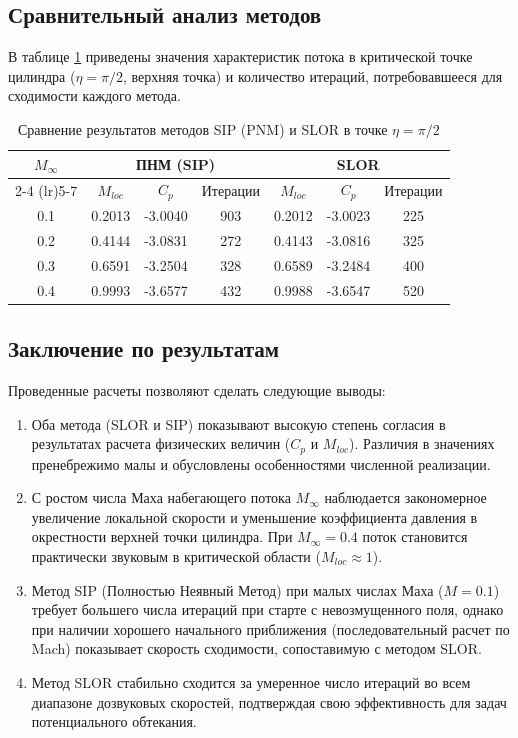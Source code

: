 \subsection{Сравнительный анализ методов}

В таблице \ref{tab:comparison} приведены значения характеристик потока в критической точке цилиндра ($\eta = \pi/2$, верхняя точка) и количество итераций, потребовавшееся для сходимости каждого метода.

\begin{table}[H]
    \centering
    \caption{Сравнение результатов методов SIP (PNM) и SLOR в точке $\eta = \pi/2$}
    \label{tab:comparison}
    \begin{tabular}{@{}ccccccc@{}}
        \toprule
        $M_\infty$ & \multicolumn{3}{c}{ПНМ (SIP)} & \multicolumn{3}{c}{SLOR} \\
        \cmidrule(lr){2-4} \cmidrule(lr){5-7}
                   & $M_{loc}$ & $C_p$ & Итерации & $M_{loc}$ & $C_p$ & Итерации \\
        \midrule
        0.1        & 0.2013    & -3.0040 & 903      & 0.2012    & -3.0023 & 225      \\
        0.2        & 0.4144    & -3.0831 & 272      & 0.4143    & -3.0816 & 325      \\
        0.3        & 0.6591    & -3.2504 & 328      & 0.6589    & -3.2484 & 400      \\
        0.4        & 0.9993    & -3.6577 & 432      & 0.9988    & -3.6547 & 520      \\
        \bottomrule
    \end{tabular}
\end{table}

\subsection{Заключение по результатам}

Проведенные расчеты позволяют сделать следующие выводы:
\begin{enumerate}
    \item Оба метода (SLOR и SIP) показывают высокую степень согласия в результатах расчета физических величин ($C_p$ и $M_{loc}$). Различия в значениях пренебрежимо малы и обусловлены особенностями численной реализации.
    \item С ростом числа Маха набегающего потока $M_\infty$ наблюдается закономерное увеличение локальной скорости и уменьшение коэффициента давления в окрестности верхней точки цилиндра. При $M_\infty = 0.4$ поток становится практически звуковым в критической области ($M_{loc} \approx 1$).
    \item Метод SIP (Полностью Неявный Метод) при малых числах Маха ($M=0.1$) требует большего числа итераций при старте с невозмущенного поля, однако при наличии хорошего начального приближения (последовательный расчет по Mach) показывает скорость сходимости, сопоставимую с методом SLOR.
    \item Метод SLOR стабильно сходится за умеренное число итераций во всем диапазоне дозвуковых скоростей, подтверждая свою эффективность для задач потенциального обтекания.
\end{enumerate}

\newpage
